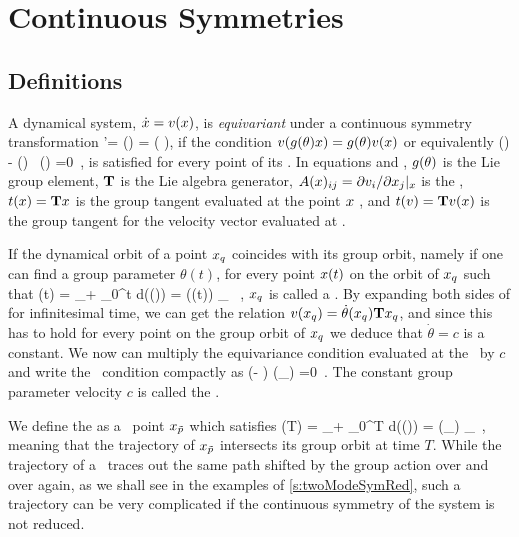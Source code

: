 \section{Continuous Symmetries}
\label{s:symm}

\subsection{Definitions}

A dynamical system, $\dot{x}=v(x)$, is \emph{equivariant} under a continuous
symmetry transformation
\beq
	\ssp'= \LieEl (\theta) \ssp = \exp\left( \theta \Lg\right)\ssp,
if the condition 
$v(g (\theta) x ) = g (\theta) v( x ) $ 
or equivalently 
\beq
  \groupTan(\vel)  - \Mvar(\ssp) \, \groupTan(\ssp) =0
  \,,
is satisfied for every point of its \statesp . In equations  
and , $g (\theta)$ is the Lie group element, $\mathbf{T}$ 
is the Lie algebra generator, $A(x)_{ij} = {\partial v_i}/{\partial x_j} |_x$  
is the \stabmat , $ t(x) = \mathbf{T} x $ is the group tangent evaluated 
at the point $x$ , and $ t(v) = \mathbf{T} v(x) $ is the group 
tangent for the velocity vector evaluated at \ssp .

\label{s:relatives}

If the dynamical orbit of a point $x_q$ coincides with its group 
orbit, namely if one can find a group parameter $\theta (t)$, for every point $x (t)$
on the orbit of $x_q$ such that
\beq
  \ssp (t) = \ssp_\stagn + \int_0^t d\tau \vel(\ssp (\tau)) = \LieEl (\theta (t)) \ssp_\stagn
  \, ,
 $x_q$ is called a \emph{ \reqv }. By expanding both sides of 
for infinitesimal time, we can get the relation 
$v(x_q) = \dot{\theta}(x_q) \mathbf{T} x_q$,
and since this has to hold for every point on the group orbit of $x_q$
we deduce that $\dot{\theta} = c$ is a constant. We now can multiply the equivariance
condition  evaluated at the \reqv\ by $c$ and write the
\reqv\ condition compactly as
\beq
(\velRel \Lg - \Mvar ) \vel (\ssp_\stagn) =0
\,.
The constant group parameter velocity $c$  is called the \phaseVel .

We define the  \emph{ \rpo} as a \statesp\ point $x_{\tilde{p}}$ which satisfies
\beq
  \ssp (T) = \ssp_\rpprime  + \int_0^T d\tau \vel(\ssp (\tau)) = \LieEl (\theta_\rpprime ) \ssp_\rpprime
  \,,
meaning that the trajectory of $x_{\tilde{p}}$ intersects its group orbit at
time $T$. While the trajectory of a \rpo\ traces out the same path shifted
by the group action over and over again, as we shall see in the examples of
\ref{s:twoModeSymRed}, such a trajectory can be very complicated if the 
continuous symmetry of the system is not reduced.

